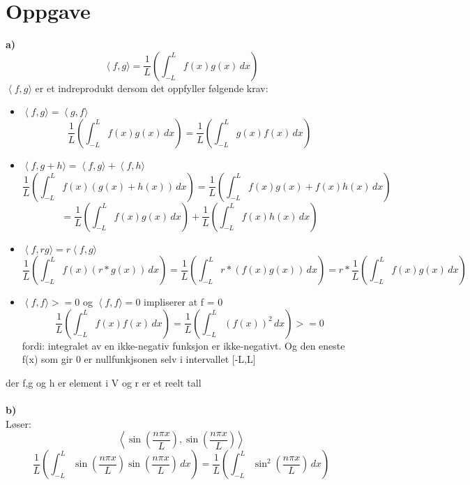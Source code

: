 \documentclass[12pt,norsk,a4paper]{article}
\begin{document}
    \newpage


    \section{Oppgave}
    \textbf{a)}\\

    \[\left\langle f,g \right.\rangle=
    \frac{1}{L}\left(\int_{-L}^{L} f(x)g(x)\,dx\right)\]
    $\left\langle f,g \right.\rangle$ er et indreprodukt dersom det oppfyller følgende krav:\\
    \begin{itemize}
        \item $\left\langle f,g \right.\rangle = \left\langle g,f \right.\rangle$
            \[\frac{1}{L}\left(\int_{-L}^{L} f(x)g(x)\,dx\right) = \frac{1}{L}\left(\int_{-L}^{L} g(x)f(x)\,dx\right)\]
        \item $\left\langle f,g+h \right.\rangle = \left\langle f,g \right.\rangle + \left\langle f,h \right.\rangle$
            \[\frac{1}{L}\left(\int_{-L}^{L} f(x)(g(x)+h(x))\,dx\right) = \frac{1}{L}\left(\int_{-L}^{L} f(x)g(x)+f(x)h(x)\,dx\right)\] \[=\frac{1}{L}\left(\int_{-L}^{L} f(x)g(x)\,dx\right) + \frac{1}{L}\left(\int_{-L}^{L}f(x)h(x)\,dx\right)\]
        \item $\left\langle f,rg \right.\rangle = r\left\langle f,g \right.\rangle$
            \[\frac{1}{L}\left(\int_{-L}^{L} f(x)(r*g(x))\,dx\right) = \frac{1}{L}\left(\int_{-L}^{L} r*(f(x)g(x))\,dx\right) = r*\frac{1}{L}\left(\int_{-L}^{L} f(x)g(x)\,dx\right)\]
        \item $\left\langle f,f \right.\rangle >= 0 $ og $ \left\langle f,f \right.\rangle = 0$ impliserer at f = 0
            \[\frac{1}{L}\left(\int_{-L}^{L} f(x)f(x)\,dx\right) = \frac{1}{L}\left(\int_{-L}^{L} (f(x))^2\,dx\right) >= 0\]
            fordi: integralet av en ikke-negativ funksjon er ikke-negativt. Og den eneste f(x) som gir 0 er nullfunkjsonen selv i intervallet [-L,L]
    \end{itemize}
    der f,g og h er element i V og r er et reelt tall\\\\
    \textbf{b)}\\
        Løser:\\
        \[\left\langle \sin(\frac{n\pi x}{L}),\sin(\frac{n\pi x}{L}) \right\rangle\]
        \[\frac{1}{L}\left(\int_{-L}^{L} \sin(\frac{n\pi x}{L})\sin(\frac{n\pi x}{L})\,dx\right) = \frac{1}{L}\left(\int_{-L}^{L} \sin^2(\frac{n\pi x}{L})\,dx\right)\]\\
\end{document}
